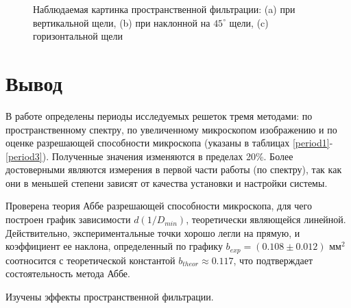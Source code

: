 \documentclass[a4paper,12pt]{article}
\begin{document}
\begin{figure}[h]
\begin{minipage}[h]{0.3\linewidth}
	\end{minipage}
	\hfill
	\begin{minipage}[h]{0.3\linewidth}
	\end{minipage}
	\caption{Наблюдаемая картинка пространственной фильтрации: (a) при вертикальной щели, (b) при наклонной на $45^\circ$ щели, (c) горизонтальной щели }
	\label{rotate}
\end{figure}




\section*{Вывод} 

В работе определены периоды исследуемых решеток тремя методами: по пространственному спектру, по увеличенному микроскопом изображению и по оценке разрешающей способности микроскопа (указаны в таблицах \ref{period1}-\ref{period3}). Полученные значения изменяются в пределах 20\%. Более достоверными являются измерения в первой части работы (по спектру), так как они в меньшей степени зависят от качества установки и настройки системы. 

Проверена теория Аббе разрешающей способности микроскопа, для чего построен график зависимости $d(1/D_{min})$, теоретически являющейся линейной. Действительно, экспериментальные точки хорошо легли на прямую, и коэффициент ее наклона, определенный по графику $b_{exp} = (0.108 \pm 0.012) \text{ мм}^2$ соотносится с теоретической константой $b_{theor} \approx 0.117$, что подтверждает состоятельность метода Аббе.

Изучены эффекты пространственной фильтрации.  
\end{document}
